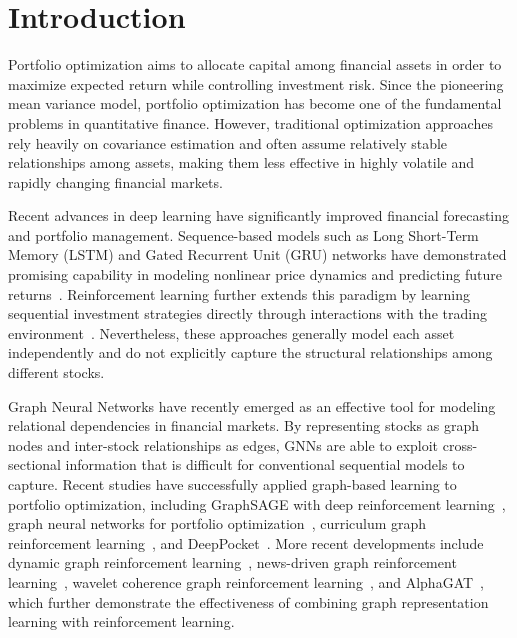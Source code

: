 \documentclass[runningheads]{llncs}
\begin{document}

\section{Introduction}

Portfolio optimization aims to allocate capital among financial assets in order to maximize expected return while controlling investment risk. Since the pioneering mean variance model, portfolio optimization has become one of the fundamental problems in quantitative finance. However, traditional optimization approaches rely heavily on covariance estimation and often assume relatively stable relationships among assets, making them less effective in highly volatile and rapidly changing financial markets.

Recent advances in deep learning have significantly improved financial forecasting and portfolio management. Sequence-based models such as Long Short-Term Memory (LSTM) and Gated Recurrent Unit (GRU) networks have demonstrated promising capability in modeling nonlinear price dynamics and predicting future returns~\cite{ma2023novel}. Reinforcement learning  further extends this paradigm by learning sequential investment strategies directly through interactions with the trading environment~\cite{wei2023deep,ngo2023reinforcement,yang2023deep}. Nevertheless, these approaches generally model each asset independently and do not explicitly capture the structural relationships among different stocks.

Graph Neural Networks have recently emerged as an effective tool for modeling relational dependencies in financial markets. By representing stocks as graph nodes and inter-stock relationships as edges, GNNs are able to exploit cross-sectional information that is difficult for conventional sequential models to capture. Recent studies have successfully applied graph-based learning to portfolio optimization, including GraphSAGE with deep reinforcement learning~\cite{sun2024graphsage}, graph neural networks for portfolio optimization~\cite{ekmekcioglu2023graph}, curriculum graph reinforcement learning~\cite{salamai2024curriculum}, and DeepPocket~\cite{soleymani2021deep}. More recent developments include dynamic graph reinforcement learning~\cite{sun2024dynamic}, news-driven graph reinforcement learning~\cite{bian2024ngdrl}, wavelet coherence graph reinforcement learning~\cite{ma2024dynamic}, and AlphaGAT~\cite{li2025alphagat}, which further demonstrate the effectiveness of combining graph representation learning with reinforcement learning.
\end{document}
